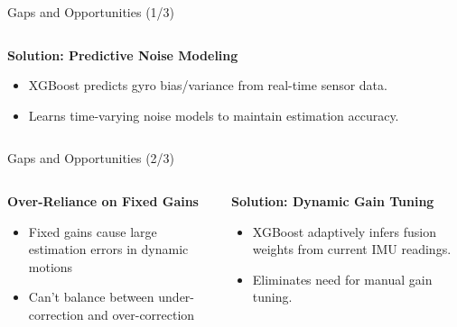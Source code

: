 \documentclass[aspectratio=169,xcolor=dvipsnames]{beamer}
\begin{document}
\begin{frame}{Gaps and Opportunities (1/3)}
\begin{columns}[T]
    \begin{column}{0.48\textwidth}
    \begin{exampleblock}{{\textbf{Solution: Predictive Noise Modeling}}}
    \begin{itemize}
        \item XGBoost predicts gyro bias/variance from real-time sensor data.
        \item Learns time-varying noise models to maintain estimation accuracy.
    \end{itemize}
    \end{exampleblock}
    \end{column}
\end{columns}
\end{frame}

\begin{frame}{Gaps and Opportunities (2/3)}
\scriptsize
\begin{columns}[T]
    \begin{column}{0.48\textwidth}
    \begin{block}{{\textbf{Over-Reliance on Fixed Gains}}}
    \begin{itemize}
        \item Fixed gains cause large estimation errors in dynamic motions \cite{vandijk2021mlreview}\cite{madgwick2011estimation}
        \item Can't balance between under-correction and over-correction\cite{shao2023variablegainflushsesnsing}\cite{EKF}
    \end{itemize}
    \end{block}
    \end{column}
    
    \begin{column}{0.48\textwidth}
    \begin{exampleblock}{{\textbf{Solution: Dynamic Gain Tuning}}}
    \begin{itemize}
        \item XGBoost adaptively infers fusion weights from current IMU readings.
        \item Eliminates need for manual gain tuning.
    \end{itemize}
    \end{exampleblock}
    \end{column}
\end{columns}

\vspace{0.8em}


\end{frame}
\end{document}
